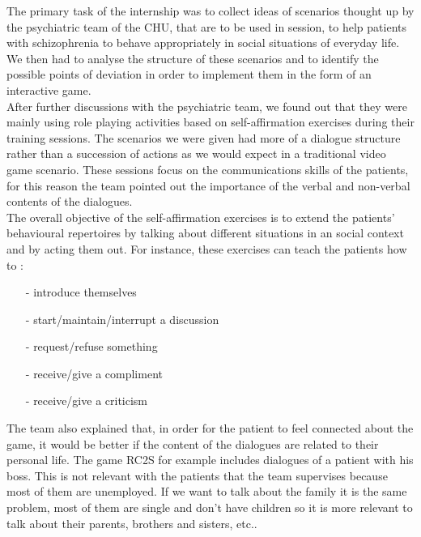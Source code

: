\documentclass[11pt]{article}
\begin{document}
The primary task of the internship was to collect ideas of scenarios thought up by the psychiatric team of the CHU, that are to be used in session, to help patients with schizophrenia to behave appropriately in social situations of everyday life. We then had to analyse the structure of these scenarios and to identify the possible points of deviation in order to implement them in the form of an interactive game.\\

After further discussions with the psychiatric team, we found out that they were mainly using role playing activities based on self-affirmation exercises during their training sessions. The scenarios we were given had more of a dialogue structure rather than a succession of actions as we would expect in a traditional video game scenario. These sessions focus on the communications skills of the patients, for this reason the team pointed out the importance of the verbal and non-verbal contents of the dialogues. \\

The overall objective of the self-affirmation exercises is to extend the patients' behavioural repertoires by talking about different situations in an social context and by acting them out. For instance, these exercises can teach the patients how to : \begin{itemize}[noitemsep]
\item[-] introduce themselves
\item[-] start/maintain/interrupt a discussion
\item[-] request/refuse something
\item[-] receive/give a compliment
\item[-] receive/give a criticism
\end{itemize}
The team also explained that, in order for the patient to feel connected about the game, it would be better if the content of the dialogues are related to their personal life. The game RC2S \citep{Peyroux14} for example includes dialogues of a patient with his boss. This is not relevant with the patients that the team supervises because most of them are unemployed. If we want to talk about the family it is the same problem, most of them are single and don't have children so it is more relevant to talk about their parents, brothers and sisters, etc..\\
\end{document}
